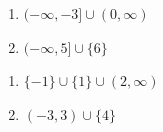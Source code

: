 \documentclass[11pt]{article}
\theoremstyle{definition}  %
\newcounter{HW}
\begin{document}
\begin{multicols}{2}
\begin{enumerate}
\setcounter{enumi}{\value{HW}}

\item $(-\infty, -3] \cup (0, \infty)$

\item $(-\infty, 5] \cup \{6\}$

\setcounter{HW}{\value{enumi}}
\end{enumerate}
\end{multicols}

\begin{multicols}{2}
\begin{enumerate}
\setcounter{enumi}{\value{HW}}


\item $\{-1\} \cup \{1\} \cup (2, \infty)$

\item $(-3,3) \cup \{4\}$

\setcounter{HW}{\value{enumi}}
\end{enumerate}
\end{multicols}
\end{document}
